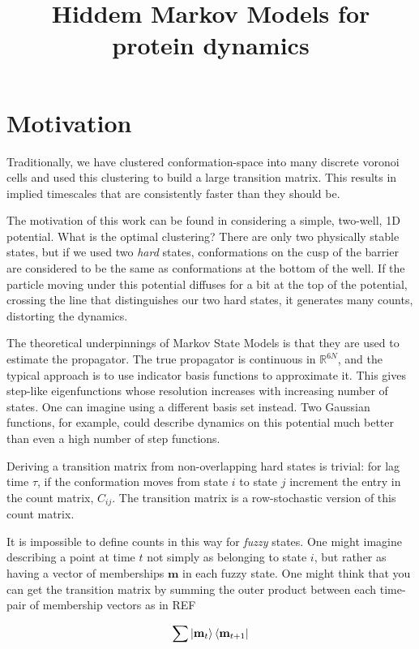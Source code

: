 \documentclass[10pt]{article}
\begin{document}
\title{Hiddem Markov Models for protein dynamics}

\section{Motivation}

Traditionally, we have clustered conformation-space into many discrete
voronoi cells and used this clustering to build a large transition matrix.
This results in implied timescales that are consistently faster than they
should be. 

The motivation of this work can be found in considering a simple, two-well,
1D potential. What is the optimal clustering? There are only two physically
stable states, but if we used two \textit{hard} states, conformations on the cusp
of the barrier are considered to be the same as conformations at the bottom of the well.
If the particle moving under this potential diffuses for a bit at the top of the potential,
crossing the line that distinguishes our two hard states, it generates many counts, distorting
the dynamics. 

The theoretical underpinnings of Markov State Models is that they are used to estimate
the propagator. The true propagator is continuous in $\mathbb{R}^{6N}$, and the typical
approach is to use indicator basis functions to approximate it. This gives step-like
eigenfunctions whose resolution increases with increasing number of states. One can imagine
using a different basis set instead. Two Gaussian functions, for example, could describe
dynamics on this potential much better than even a high number of step functions.

Deriving a transition matrix from non-overlapping hard states is trivial: for lag time
$\tau$, if the conformation moves from state $i$ to state $j$ increment the entry
in the count matrix, $C_{ij}$. The transition matrix is a row-stochastic version of
this count matrix.

It is impossible to define counts in this way for \textit{fuzzy} states. One might
imagine describing a point at time $t$ not simply as belonging to state $i$, but rather as 
having a vector of memberships $\mathbf{m}$ in each fuzzy state. One might think
that you can get the transition matrix by summing the outer product between each
time-pair of membership vectors as in REF

\begin{equation}
\sum \Ket{\mathbf{m}_t} \Bra{\mathbf{m}_{t+1}}
\end{equation}
\end{document}
